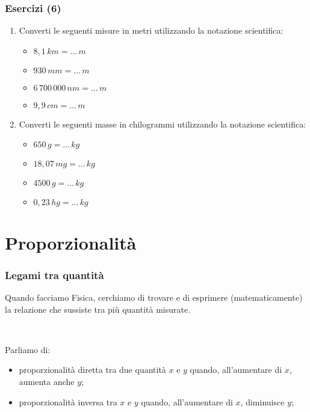 \documentclass[]{beamer}
\begin{document}
\begin{frame}
\frametitle{Esercizi (6)}
\begin{enumerate}
  \item Converti le seguenti misure in metri utilizzando la notazione scientifica:
  \begin{multicols}{2}
    \begin{itemize}
        \item $ 8,1 \, km = \ldots \, m $
        \item $ 930 \, mm = \ldots \, m $
        \item $ 6\,700\,000 \, nm = \ldots \, m $
        \item $ 9,9 \, cm = \ldots \, m $
    \end{itemize}
  \end{multicols}
  \item Converti le seguenti masse in chilogrammi utilizzando la notazione scientifica:
  \begin{multicols}{2}
    \begin{itemize}
        \item $ 650 \, g = \ldots \, kg $
        \item $ 18,07 \, mg = \ldots \, kg $
        \item $ 4500 \, g = \ldots \, kg $
        \item $ 0,23 \, hg = \ldots \, kg $
    \end{itemize}
  \end{multicols}
\end{enumerate}
\end{frame}



\section{Proporzionalità}

\begin{frame}
\frametitle{Legami tra quantità}
Quando facciamo Fisica, cerchiamo di trovare e di esprimere (matematicamente) la \alert<1>{relazione che sussiste tra più quantità misurate}.\pause

~

Parliamo di:
\begin{itemize}
  \item \alert<2>{proporzionalità diretta} tra due quantità $ x $ e $ y $ quando, all'aumentare di $ x $, aumenta anche $ y $;\pause
  \item \alert<3>{proporzionalità inversa} tra $ x $ e $ y $ quando, all'aumentare di $ x $, diminuisce $ y $;
\end{itemize}
\end{frame}
\end{document}
